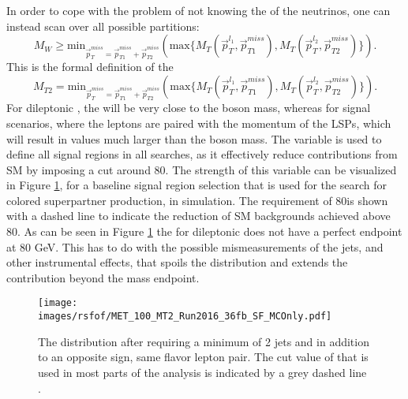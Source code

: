 In order to cope with the problem of not knowing the \pt of the neutrinos, one can instead scan over all possible \ptmiss partitions: 
\begin{equation}
M_{W}\geq \mathrm{min}_{\vec{p}_{T}^{miss}=\vec{p}_{T1}^{miss}+\vec{p}_{T2}^{miss}}\left( \mathrm{max}\{M_{T}\left(\vec{p}_{T}^{l_{1}},\vec{p}_{T1}^{miss}\right), M_{T}\left(\vec{p}_{T}^{l_{2}},\vec{p}_{T2}^{miss}\right)\}\right).
\end{equation}
This is the formal definition of the \mttwo 
\begin{equation}
M_{T2}= \mathrm{min}_{\vec{p}_{T}^{miss}=\vec{p}_{T1}^{miss}+\vec{p}_{T2}^{miss}}\left( \mathrm{max}\{M_{T}\left(\vec{p}_{T}^{l_{1}},\vec{p}_{T1}^{miss}\right), M_{T}\left(\vec{p}_{T}^{l_{2}},\vec{p}_{T2}^{miss}\right)\}\right).
\end{equation}
For dileptonic \ttbar, the \mttwo will be very close to the \PW boson mass, whereas for signal scenarios, where the leptons are paired with the momentum of the LSPs, which will result in values much larger than the \PW boson mass. 
The \mttwo variable is used to define all signal regions in all searches, as it effectively reduce contributions from SM \ttbar by imposing a cut around 80\GeV.
The strength of this variable can be visualized in Figure \ref{fig:mttwoSim}, for a baseline signal region selection that is used for the search for colored superpartner production, in simulation. 
The \mttwo requirement of 80\GeV is shown with a dashed line to indicate the reduction of SM backgrounds achieved above 80\GeV. 
As can be seen in Figure \ref{fig:mttwoSim} the \mttwo for dileptonic \ttbar does not have a perfect endpoint at 80 GeV. 
This has to do with the possible mismeasurements of the jets, and other instrumental effects, that spoils the distribution and extends the \ttbar contribution beyond the \PW mass endpoint.
\begin{figure}[htbp!]
\begin{center}
    \texttt{[image: images/rsfof/MET\_100\_MT2\_Run2016\_36fb\_SF\_MCOnly.pdf]}
    \caption{The \mttwo distribution after requiring a minimum of 2 jets and \GeV in addition to an opposite sign, same flavor lepton pair. 
The cut value of \GeV that is used in most parts of the analysis is indicated by a grey dashed line \cite{CMS-PAS-SUS-16-034}.}
\label{fig:mttwoSim}
\end{center}
\end{figure}
